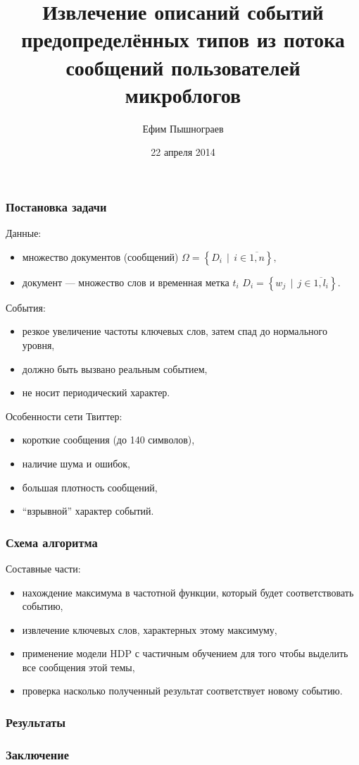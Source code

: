 \documentclass[10pt,pdf,hyperref={unicode}]{beamer}
\author{Ефим Пышнограев}
\date{22 апреля 2014}
\institute{Филиал МГУ в городе Севастополе}
\title{Извлечение описаний событий предопределённых типов из потока сообщений пользователей микроблогов}
\DeclareMathOperator{\svert}{\,\vert\,}
\begin{document}
\begin{frame}
  \titlepage
\end{frame}

\begin{frame}
  \frametitle{Постановка задачи}
  Данные:
  \begin{itemize}
  	\item 
  	множество документов (сообщений) 
  	$\Omega = \left\{D_i \svert i \in \overline{1,n} \right\},$
	\item 
	документ --- множество слов и временная метка $t_i$ 
	$D_i = \left\{w_j \svert j \in \overline{ 1, l_i } \right\}.$
  \end{itemize}
  
  События:
  \begin{itemize}
	\item резкое увеличение частоты ключевых слов, затем спад до нормального уровня,
	\item должно быть вызвано реальным событием,
	\item не носит периодический характер.
  \end{itemize}
  
  Особенности сети Твиттер:
  \begin{itemize}
  \item короткие сообщения (до 140 символов),
  \item наличие шума и ошибок,
  \item большая плотность сообщений,
  \item ``взрывной'' характер событий.
  \end{itemize}
  
\end{frame}

\begin{frame}
  \frametitle{Схема алгоритма}
  Составные части:
  \begin{itemize}
  \item нахождение максимума в частотной функции, который будет соответствовать событию,
  \item извлечение ключевых слов, характерных этому максимуму,
  \item применение модели HDP с частичным обучением для того чтобы выделить все сообщения этой темы,
  \item проверка насколько полученный результат соответствует новому событию.
  \end{itemize}
\end{frame}

\begin{frame}
  \frametitle{Результаты}
\end{frame}

\begin{frame}
  \frametitle{Заключение}
\end{frame}
\end{document}
